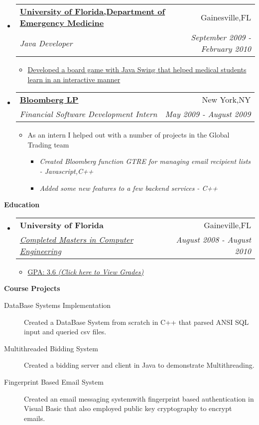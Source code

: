\documentclass[letterpaper,11pt]{article}
\makeatletter
\newcommand{\resitem}[1]{\item #1 \vspace{-2pt}}
\newcommand{\resheading}[1]{{\large \colorbox{mygrey}{\begin{minipage}{\textwidth}{\textbf{#1 \vphantom{p\^{E}}}}\end{minipage}}}}
\newcommand{\ressubheading}[4]{
\begin{tabular*}{7.0in}{l@{\extracolsep{\fill}}r}
		\textbf{#1} & #2 \\
		\textit{#3} & \textit{#4} \\
\end{tabular*}\vspace{-6pt}}
\makeatother
\begin{document}
\begin{itemize}
\item
    \ressubheading{\href{http://emergency.med.ufl.edu}{University of Florida,Department of Emergency Medicine}}{Gainesville,FL}{Java Developer}{September 2009 - February 2010}
    \begin{itemize}
        \resitem{\href{http://onlinelibrary.wiley.com/doi/10.1111/j.1553-2712.2009.00392_16.x/abstract}{Developed a board game with Java Swing that helped medical students learn in an interactive manner}}
    \end{itemize}
                
\item
    \ressubheading{\href{http://www.bloomberg.com}{Bloomberg LP}}{New York,NY}{Financial Software Development Intern}{May 2009 - August 2009}
    \begin{itemize}
    	\resitem{As an intern I helped out with a number of projects in the Global Trading team}
        \begin{itemize}
        	   \resitem{\emph{Created Bloomberg function GTRE for managing email recipient lists - Javascript,C++}}
            \resitem{\emph{Added some new features to a few backend services - C++ }}
         \end{itemize}
    \end{itemize}
    
    
\end{itemize}

	
\resheading{Education}
\begin{itemize}
\item
    \ressubheading{University of Florida}{Gaineville,FL}{\href{http://dl.dropbox.com/u/23360122/UF_Grades.pdf}{Completed Masters in Computer Engineering}}{August 2008 - August 2010}
    \begin{itemize}
        \resitem{\href{https://dl.dropboxusercontent.com/u/23360122/UF_GRADES.pdf}{GPA: 3.6 \emph{(Click here to View Grades)}}}
    \end{itemize}
\end{itemize}

\resheading{Course Projects}
\begin{description}
\item[DataBase Systems Implementation] Created a DataBase System from scratch in C++ that parsed ANSI SQL input and queried csv files.
\item[Multithreaded Bidding System] Created a bidding server and client in Java to demonstrate Multithreading.
\item[Fingerprint Based Email System] Created an email messaging systemwith fingerprint based authentication in Visual Basic that also employed public key cryptography to encrypt emails.
\end{description}
\end{document}
